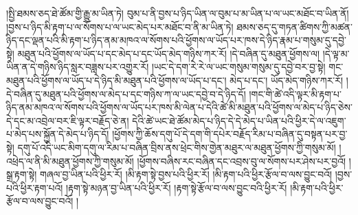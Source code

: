 །སྤྱི་ཐམས་ཅད་ཐེ་ཚོམ་གྱི་རྒྱུ་མ་ཡིན་ཏེ། བུམ་པ་ནི་བྱས་པ་ཉིད་ཡིན་ལ་བུམ་པ་མ་ཡིན་པ་ལ་ཡང་མཐོང་བ་ཡིན་ནོ། །བྱས་པ་ཉིད་མི་རྟག་པ་ལ་སོགས་པ་ལ་ཡང་མེད་པར་མཐོང་བ་ནི་མ་ཡིན་ཏེ། ཐམས་ཅད་དུ་གཏན་ཚིགས་ཀྱི་མཚན་ཉིད་དང་ལྡན་པའི་མི་རྟག་པ་ཉིད་ནམ་མཁའ་ལ་སོགས་པའི་ཕྱོགས་ལ་ཡོད་པར་ཁས་དེ་ཉིད་རྣམ་པ་གསུམ་དུ་དབྱེ་སྟེ། མཐུན་པའི་ཕྱོགས་ལ་ཡོད་པ་དང་མེད་པ་དང་ཡོད་མེད་གཉིས་ཀར་རོ། །དེ་བཞིན་དུ་མཐུན་ཕྱོགས་ལ། །དེ་ལྟ་མ་ཡིན་ན་དེ་གཉིས་ཉིད་སླར་བཟླས་པར་འགྱུར་རོ། །ཡང་དེ་དག་རེ་རེ་ལ་ཡང་གསུམ་གསུམ་དུ་དབྱེ་བར་བྱ་སྟེ། གང་མཐུན་པའི་ཕྱོགས་ལ་ཡོད་པ་དེ་ཉིད་མི་མཐུན་པའི་ཕྱོགས་ལ་ཡོད་པ་དང་། མེད་པ་དང་། ཡོད་མེད་གཉིས་ཀར་རོ། །དེ་བཞིན་དུ་མཐུན་པའི་ཕྱོགས་ལ་མེད་པ་དང་གཉིས་ཀ་ལ་ཡང་དབྱེ་བ་དེ་ཉིད་དོ། །གང་གི་ཚེ་འདི་ལྟར་མི་རྟག་པ་ཉིད་ནམ་མཁའ་ལ་སོགས་པའི་ཕྱོགས་ལ་ཡོད་པར་ཁས་མི་ལེན་པ་དེའི་ཚེ་མི་མཐུན་པའི་ཕྱོགས་ལ་མེད་པ་ཉིད་ཅེས་དེ་དང་མ་འབྲེལ་བར་ཇི་ལྟར་བརྗོད་ཅེ་ན། དེའི་ཚེ་ཡང་ཐེ་ཚོམ་མེད་པ་ཉིད་དེ་དེ་མེད་པ་ཡིན་པའི་ཕྱིར་དེ་ལ་འཇུག་པ་མེད་པས་སྐྱོན་དེ་མེད་པ་ཉིད་དོ། །ཕྱོགས་ཀྱི་ཆོས་དགུ་པོ་དེ་དག་གི་དཔེར་བརྗོད་རིམ་པ་བཞིན་དུ་བསྟན་པར་བྱ་སྟེ། དགུ་པོ་འདི་ཡང་མིག་དགུ་ལ་རིམ་པ་བཞིན་བྲིས་ནས་ཕྲེང་གིས་གྱེན་མཐུར་ལ་མཐུན་ཕྱོགས་ཀྱི་གསུམ་མོ། །འཕྲེད་ལ་ནི་མི་མཐུན་ཕྱོགས་ཀྱི་གསུམ་མོ། །ཕྱོགས་བཞིས་རང་བཞིན་དང་འབྲས་བུ་ལ་སོགས་པར་ཤེས་པར་བྱའོ། །སྒྲ་རྟག་སྟེ། གཞལ་བྱ་ཡིན་པའི་ཕྱིར་རོ། །མི་རྟག་སྟེ་བྱས་པའི་ཕྱིར་རོ། །མི་རྟག་པའི་ཕྱིར་རྩོལ་བ་ལས་བྱུང་བའོ། །བྱས་པའི་ཕྱིར་རྟག་པའོ། །རྟག་སྟེ་མཉན་བྱ་ཡིན་པའི་ཕྱིར་རོ། །རྟག་སྟེ་རྩོལ་བ་ལས་བྱུང་བའི་ཕྱིར་རོ། །མི་རྟག་པའི་ཕྱིར་རྩོལ་བ་ལས་བྱུང་བའོ། །
